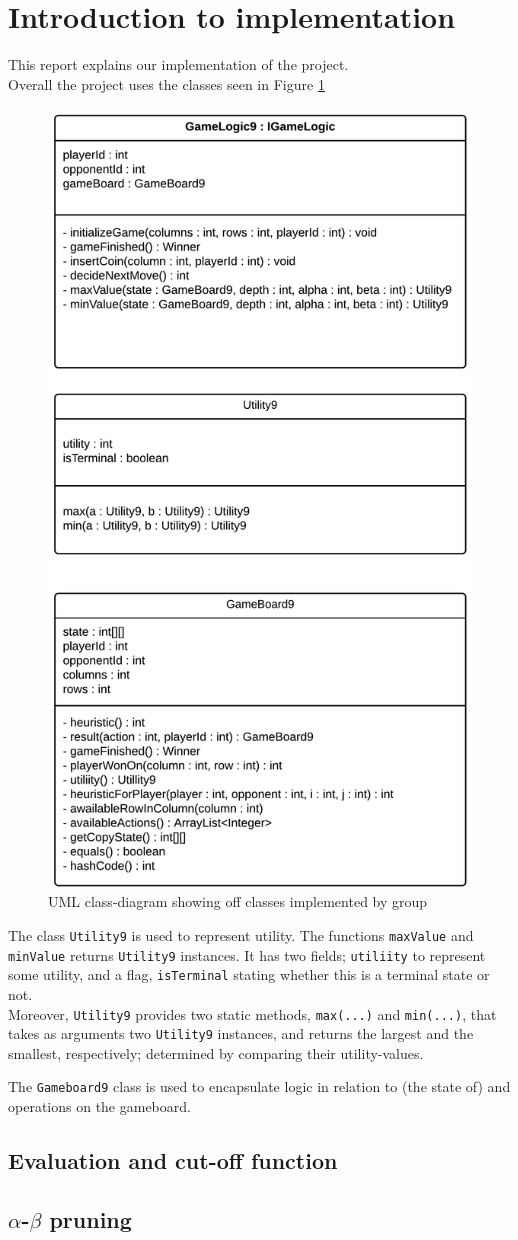 \section{Introduction to implementation}
This report explains our implementation of the project. \\
Overall the project uses the classes seen in Figure \ref{fig:UMLClassDiagram}

\begin{figure}[h!]
\centering
\includegraphics[width=0.65\linewidth]{ClassDiagram.png}
\caption{UML class-diagram showing off classes implemented by group \label{fig:UMLClassDiagram}}
\end{figure}

The class \texttt{Utility9} is used to represent utility. The functions \texttt{maxValue} and \texttt{minValue} returns \texttt{Utility9} instances. It has two fields; \texttt{utiliity} to represent some utility, and a flag, \texttt{isTerminal} stating whether this is a terminal state or not. \\
Moreover, \texttt{Utility9} provides two static methods, \texttt{max(...)} and \texttt{min(...)}, that takes as arguments two \texttt{Utility9} instances, and returns the largest and the smallest, respectively; determined by comparing their utility-values. 

The \texttt{Gameboard9} class is used to encapsulate logic in relation to (the state of) and operations on the gameboard. 

\subsection{Evaluation and cut-off function}



\subsection{$\alpha$-$\beta$ pruning}